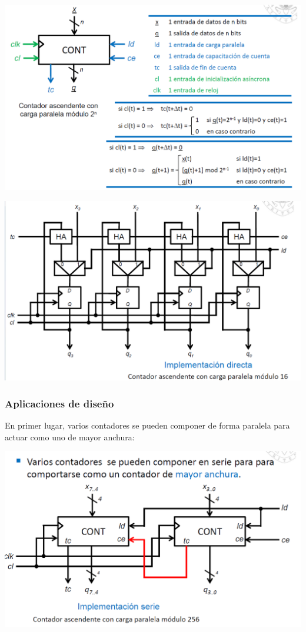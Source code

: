 \documentclass[a4paper,10pt]{book}
\begin{document}
\begin{center}
\includegraphics[scale=0.42]{contador de carga paralela}
\end{center}

\begin{center}
\includegraphics[scale=0.4]{implementacion contador de carga paralela}
\end{center}

\subsubsection*{Aplicaciones de diseño}
En primer lugar, varios contadores se pueden componer de forma paralela para actuar como uno de mayor anchura:

\begin{center}
\includegraphics[scale=0.4]{contador anchura}
\end{center}
\end{document}
